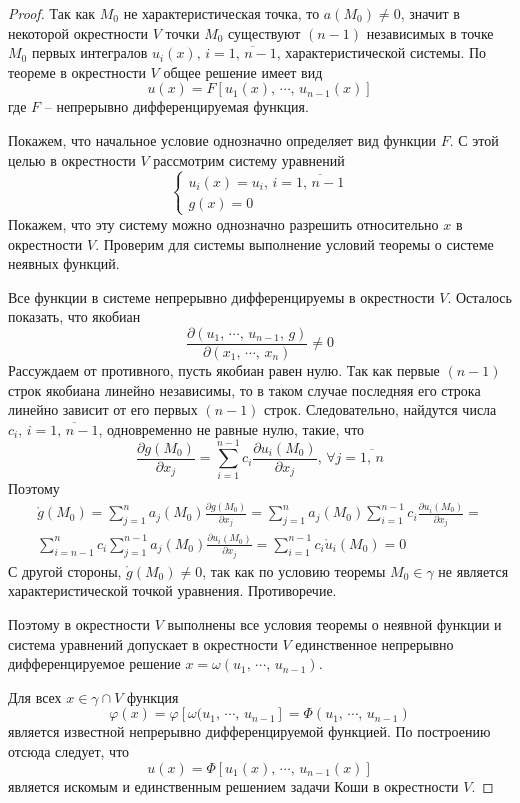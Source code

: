\documentclass[a4paper,12pt]{article}
\renewcommand{\phi}{\ensuremath{\varphi}}
\theoremstyle{plain}
\theoremstyle{definition}
\theoremstyle{remark}
\begin{document}
\begin{proof}
	Так как $M_0$ не характеристическая точка, то $a(M_0) \neq 0$, значит в некоторой окрестности $V$ точки $M_0$ существуют $(n-1)$ независимых в точке $M_0$ первых интегралов $u_i(x),\, i =\overline{1,\,n-1}$, характеристической системы. По теореме в окрестности $V$ общее решение имеет вид
	\[u(x) = F[u_1(x),\,\cdots,\,u_{n - 1}(x)]\]
	где $F$ -- непрерывно дифференцируемая функция.

	Покажем, что начальное условие однозначно определяет вид функции $F$. С этой целью в окрестности $V$ рассмотрим систему уравнений
	\[\begin{cases}
			u_i(x) = u_i,\, i = \overline{1,\,n-1} \\
			g(x) = 0
		\end{cases}\]
	Покажем, что эту систему можно однозначно разрешить относительно $x$ в окрестности $V$. Проверим для системы выполнение условий теоремы о системе неявных функций.

	Все функции в системе непрерывно дифференцируемы в окрестности $V$. Осталось показать, что якобиан
	\[\frac{\partial(u_1,\,\cdots,\,u_{n-1},\,g)}{\partial(x_1,\,\cdots,\,x_n)} \neq 0\]
	Рассуждаем от противного, пусть якобиан равен нулю. Так как первые $(n-1)$ строк якобиана линейно независимы, то в таком случае последняя его строка линейно зависит от его первых $(n-1)$ строк. Следовательно, найдутся числа $c_i,\, i = \overline{1,\,n-1}$, одновременно не равные нулю, такие, что
	\[\frac{\partial g(M_0)}{\partial x_j} = \sum_{i = 1}^{n-1}c_i\frac{\partial u_i(M_0)}{\partial x_j},\, \forall j = \overline{1,\,n}\]
	Поэтому
	\begin{align*}
		\mathring{g}(M_0) = \sum_{j = 1}^n a_j(M_0)\frac{\partial g(M_0)}{\partial x_j} = \sum_{j = 1}^n a_j(M_0)\sum_{i = 1}^{n-1}c_i\frac{\partial u_i(M_0)}{\partial x_j} = \\
		\sum_{i = n-1}^n c_i \sum_{j = 1}^{n-1} a_j(M_0)\frac{\partial u_i(M_0)}{\partial x_j} = \sum_{i = 1}^{n-1}c_i\mathring{u}_i(M_0) = 0
	\end{align*}
	С другой стороны, $\mathring{g}(M_0) \neq 0$, так как по условию теоремы $M_0 \in \gamma$ не является характеристической точкой уравнения. Противоречие.

	Поэтому в окрестности $V$ выполнены все условия теоремы о неявной функции и система уравнений допускает в окрестности $V$ единственное непрерывно дифференцируемое решение $x = \omega(u_1,\,\cdots,\,u_{n-1})$.

	Для всех $x \in \gamma \cap V$ функция
	\[\phi(x) = \phi[\omega(u_1,\,\cdots,\,u_{n-1}]= \Phi(u_1,\,\cdots,\,u_{n-1})\]
	является известной непрерывно дифференцируемой функцией. По построению отсюда следует, что
	\[u(x) = \Phi[u_1(x),\,\cdots,\,u_{n-1}(x)]\]
	является искомым и единственным решением задачи Коши в окрестности $V$.
\end{proof}
\end{document}
